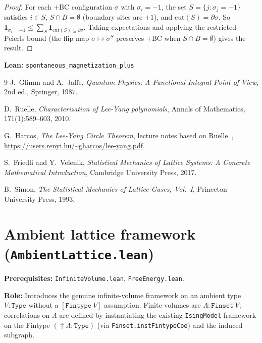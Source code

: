 \documentclass[a4paper,11pt]{article}
\begin{document}
\begin{proof}
For each $+$BC configuration $\sigma$ with $\sigma_i = -1$, the set
$S = \{j : \sigma_j = -1\}$ satisfies $i \in S$, $S \cap B = \emptyset$
(boundary sites are $+1$), and $\mathrm{cut}(S) = \partial\sigma$.
So $\mathbf{1}_{\sigma_i=-1} \le \sum_{S} \mathbf{1}_{\mathrm{cut}(S) \subseteq \partial\sigma}$.
Taking expectations and applying the restricted Peierls bound (the
flip map $\sigma \mapsto \sigma^S$ preserves $+$BC when $S \cap B = \emptyset$)
gives the result.
\end{proof}

\noindent\textbf{Lean:} \texttt{spontaneous\_magnetization\_plus}

\begin{thebibliography}{9}
J.~Glimm and A.~Jaffe,
\emph{Quantum Physics: A Functional Integral Point of View},
2nd ed., Springer, 1987.

D.~Ruelle,
\emph{Characterization of Lee-Yang polynomials},
Annals of Mathematics, 171(1):589--603, 2010.

G.~Harcos,
\emph{The Lee-Yang Circle Theorem},
lecture notes based on Ruelle~\cite{ruelle},
\url{https://users.renyi.hu/~gharcos/lee-yang.pdf}.

S.~Friedli and Y.~Velenik,
\emph{Statistical Mechanics of Lattice Systems:
A Concrete Mathematical Introduction},
Cambridge University Press, 2017.

B.~Simon,
\emph{The Statistical Mechanics of Lattice Gases, Vol.~I},
Princeton University Press, 1993.
\end{thebibliography}

\section{Ambient lattice framework (\texttt{AmbientLattice.lean})}

\par\noindent\textbf{Prerequisites:} \texttt{InfiniteVolume.lean},
\texttt{FreeEnergy.lean}.

\textbf{Role:} Introduces the genuine infinite-volume framework on
an ambient type $V : \texttt{Type}$ without a $[\texttt{Fintype}~V]$
assumption.  Finite volumes are $\Lambda : \texttt{Finset}~V$;
correlations on $\Lambda$ are defined by instantiating the existing
\texttt{IsingModel} framework on the Fintype $(\uparrow\!\Lambda :
\texttt{Type})$ (via \texttt{Finset.instFintypeCoe}) and the induced
subgraph.
\end{document}
